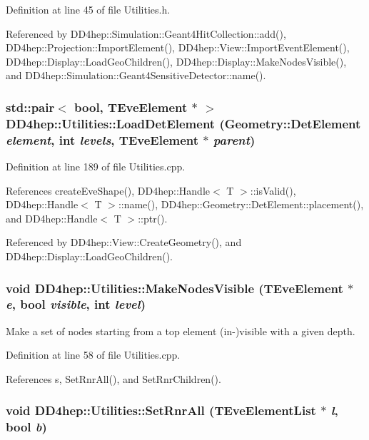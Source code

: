 Definition at line 45 of file Utilities.h.

Referenced by DD4hep::Simulation::Geant4HitCollection::add(), DD4hep::Projection::ImportElement(), DD4hep::View::ImportEventElement(), DD4hep::Display::LoadGeoChildren(), DD4hep::Display::MakeNodesVisible(), and DD4hep::Simulation::Geant4SensitiveDetector::name().\hypertarget{namespace_d_d4hep_1_1_utilities_a8f334a7b469c25f5315745d8dceb0fa7}{
\subsubsection[{LoadDetElement}]{\setlength{\rightskip}{0pt plus 5cm}std::pair$<$ bool, TEveElement $\ast$ $>$ DD4hep::Utilities::LoadDetElement (Geometry::DetElement {\em element}, \/  int {\em levels}, \/  TEveElement $\ast$ {\em parent})}}
\label{namespace_d_d4hep_1_1_utilities_a8f334a7b469c25f5315745d8dceb0fa7}


Definition at line 189 of file Utilities.cpp.

References createEveShape(), DD4hep::Handle$<$ T $>$::isValid(), DD4hep::Handle$<$ T $>$::name(), DD4hep::Geometry::DetElement::placement(), and DD4hep::Handle$<$ T $>$::ptr().

Referenced by DD4hep::View::CreateGeometry(), and DD4hep::Display::LoadGeoChildren().\hypertarget{namespace_d_d4hep_1_1_utilities_a93a4f08ad1e94bdda79153a858ab809b}{
\subsubsection[{MakeNodesVisible}]{\setlength{\rightskip}{0pt plus 5cm}void DD4hep::Utilities::MakeNodesVisible (TEveElement $\ast$ {\em e}, \/  bool {\em visible}, \/  int {\em level})}}
\label{namespace_d_d4hep_1_1_utilities_a93a4f08ad1e94bdda79153a858ab809b}


Make a set of nodes starting from a top element (in-\/)visible with a given depth. 

Definition at line 58 of file Utilities.cpp.

References s, SetRnrAll(), and SetRnrChildren().\hypertarget{namespace_d_d4hep_1_1_utilities_a92896bc98df5b92fe16f7cfc74716442}{
\subsubsection[{SetRnrAll}]{\setlength{\rightskip}{0pt plus 5cm}void DD4hep::Utilities::SetRnrAll ({\bf TEveElementList} $\ast$ {\em l}, \/  bool {\em b})}}
\label{namespace_d_d4hep_1_1_utilities_a92896bc98df5b92fe16f7cfc74716442}


